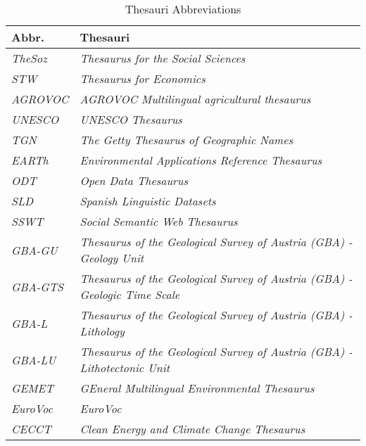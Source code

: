 \documentclass{llncs}
\begin{document}
\begin{table}[H]
	\centering
		\begin{tabular}{l|l}
      \textbf{Abbr.} & \textbf{Thesauri} \\		
      \hline
    \emph{TheSoz} & \emph{Thesaurus for the Social Sciences}\tablefootnote{\url{http://www.ecb.europa.eu/home/html/index.en.html}} \\
	  \emph{STW} & \emph{Thesaurus for Economics}\tablefootnote{\url{http://zbw.eu/stw/versions/latest/about}} \\
	  \emph{AGROVOC} & \emph{AGROVOC Multilingual agricultural thesaurus}\tablefootnote{\url{http://202.45.139.84:10035/catalogs/fao/repositories/agrovoc}} \\
		\emph{UNESCO} & \emph{UNESCO Thesaurus}\tablefootnote{\url{http://skos.um.es/sparql/}} \\
		\emph{TGN} & \emph{The Getty Thesaurus of Geographic Names}\tablefootnote{\url{http://vocab.getty.edu/sparql}} \\
		\emph{EARTh} & \emph{Environmental Applications Reference Thesaurus}\tablefootnote{\url{http://linkeddata.ge.imati.cnr.it/resource/EARTh/}} \\
		\emph{ODT} & \emph{Open Data Thesaurus}\tablefootnote{\url{http://vocabulary.semantic-web.at/PoolParty/wiki/OpenData}} \\
		\emph{SLD} & \emph{Spanish Linguistic Datasets}\tablefootnote{\url{http://linguistic.linkeddata.es}} \\
		\emph{SSWT} & \emph{Social Semantic Web Thesaurus}\tablefootnote{\url{http://vocabulary.semantic-web.at/PoolParty/wiki/semweb}} \\
		\emph{GBA-GU} & \emph{Thesaurus of the Geological Survey of Austria (GBA) - Geology Unit}\tablefootnote{\url{http://resource.geolba.ac.at/}} \\
		\emph{GBA-GTS} & \emph{Thesaurus of the Geological Survey of Austria (GBA) - Geologic Time Scale}\tablefootnote{\url{http://resource.geolba.ac.at/}} \\
		\emph{GBA-L} & \emph{Thesaurus of the Geological Survey of Austria (GBA) - Lithology}\tablefootnote{\url{http://resource.geolba.ac.at/}} \\
		\emph{GBA-LU} & \emph{Thesaurus of the Geological Survey of Austria (GBA) - Lithotectonic Unit}\tablefootnote{\url{http://resource.geolba.ac.at/}} \\
		\emph{GEMET} & \emph{GEneral Multilingual Environmental Thesaurus}\tablefootnote{\url{http://www.eionet.europa.eu/gemet/}} \\
		\emph{EuroVoc} & \emph{EuroVoc}\tablefootnote{\url{http://open-data.europa.eu/de/data/dataset/eurovoc}} \\
		\emph{CECCT} & \emph{Clean Energy and Climate Change Thesaurus}\tablefootnote{\url{http://data.reegle.info/thesaurus/guide}} \\
		\end{tabular}
	\caption{Thesauri Abbreviations}
	\label{tab:thesauri-abbreviations}
\end{table}
\end{document}
